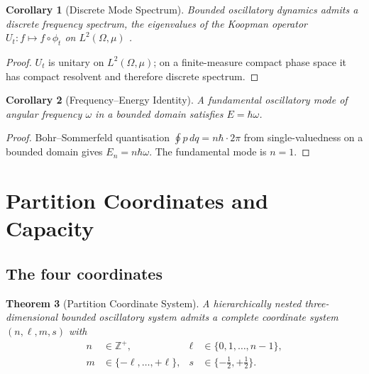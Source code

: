 \documentclass[twocolumn,10pt,a4paper]{article}
\theoremstyle{thmstyle}
\newtheorem{theorem}{Theorem}[section]
\newtheorem{corollary}[theorem]{Corollary}
\theoremstyle{definition}
\theoremstyle{remark}
\newcommand{\Zp}{\mathbb{Z}^{+}}
\begin{document}
\begin{corollary}[Discrete Mode Spectrum]
\label{cor:modes}
Bounded oscillatory dynamics admits a discrete frequency spectrum,
the eigenvalues of the Koopman operator $U_{t}:f\mapsto f\circ\phi_{t}$
on $L^{2}(\Omega,\mu)$ \citep{koopman1931}.
\end{corollary}

\begin{proof}
$U_{t}$ is unitary on $L^{2}(\Omega,\mu)$; on a finite-measure compact
phase space it has compact resolvent and therefore discrete spectrum.
\end{proof}

\begin{corollary}[Frequency--Energy Identity]
\label{cor:Ehbar}
A fundamental oscillatory mode of angular frequency $\omega$ in a
bounded domain satisfies $E=\hbar\omega$.
\end{corollary}

\begin{proof}
Bohr--Sommerfeld quantisation
$\oint p\,dq=n\hbar\cdot 2\pi$ from single-valuedness on a bounded
domain \citep{bohr1913,landau1976} gives $E_{n}=n\hbar\omega$. The
fundamental mode is $n=1$.
\end{proof}

\section{Partition Coordinates and Capacity}
\label{sec:partition}

\subsection{The four coordinates}

\begin{theorem}[Partition Coordinate System]
\label{thm:nlms}
A hierarchically nested three-dimensional bounded oscillatory system
admits a complete coordinate system $(n,\ell,m,s)$ with
\begin{align*}
n&\in\Zp,&\ell&\in\{0,1,\ldots,n-1\},\\
m&\in\{-\ell,\ldots,+\ell\},& s&\in\{-\tfrac{1}{2},+\tfrac{1}{2}\}.
\end{align*}
\end{theorem}
\end{document}
